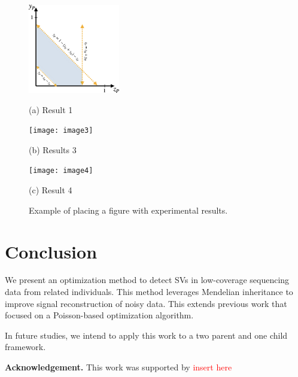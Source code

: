 \documentclass{article}
\begin{document}
	\begin{figure}[htb]
			
			\begin{minipage}[b]{1.0\linewidth}
					\centering
					\centerline{\includegraphics[width=4.0cm]{figs/parent_region.png}}
					\centerline{(a) Result 1}\medskip
				\end{minipage}
			\begin{minipage}[b]{.48\linewidth}
					\centering
					\centerline{\texttt{[image: image3]}}
					\centerline{(b) Results 3}\medskip
				\end{minipage}
			\hfill
			\begin{minipage}[b]{0.48\linewidth}
					\centering
					\centerline{\texttt{[image: image4]}}
					\centerline{(c) Result 4}\medskip
				\end{minipage}
			\caption{Example of placing a figure with experimental results.}
			\label{fig:res}
		\end{figure}
\section{Conclusion}
We present an optimization method to detect SVs in low-coverage sequencing data from related individuals. This method leverages Mendelian inheritance to improve signal reconstruction of noisy data. This extends previous work that focused on a Poisson-based optimization algorithm. 


In future studies, we intend to apply this work to a two parent and one child framework. 

\textbf{Acknowledgement.} This work was supported by \textcolor{red}{insert here}
\end{document}
